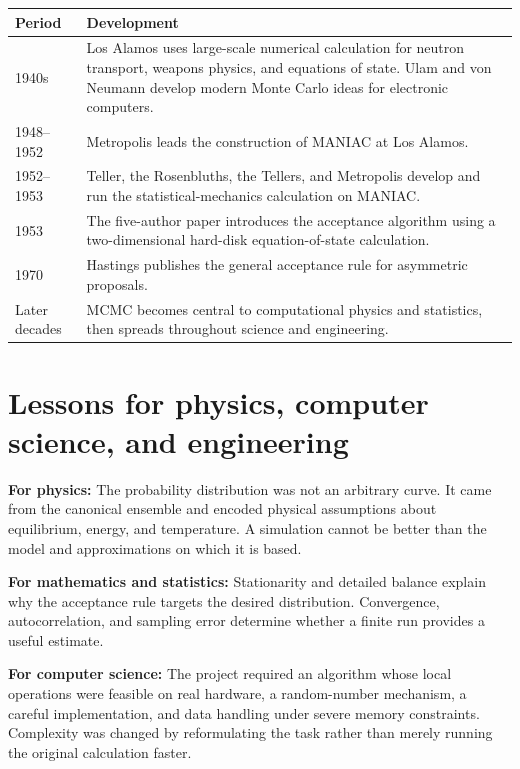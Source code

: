 \documentclass[11pt]{article}
\begin{document}
\begin{center}
\begin{tabular}{@{}p{}p{}@{}}
\toprule
\textbf{Period} & \textbf{Development} \\
\midrule
1940s & Los Alamos uses large-scale numerical calculation for neutron transport,
        weapons physics, and equations of state. Ulam and von Neumann develop
        modern Monte Carlo ideas for electronic computers. \\
1948--1952 & Metropolis leads the construction of MANIAC at Los Alamos. \\
1952--1953 & Teller, the Rosenbluths, the Tellers, and Metropolis develop and run
             the statistical-mechanics calculation on MANIAC. \\
1953 & The five-author paper introduces the acceptance algorithm using a
       two-dimensional hard-disk equation-of-state calculation. \\
1970 & Hastings publishes the general acceptance rule for asymmetric proposals. \\
Later decades & MCMC becomes central to computational physics and statistics,
                then spreads throughout science and engineering. \\
\bottomrule
\end{tabular}
\end{center}

\section{Lessons for physics, computer science, and engineering}

\textbf{For physics:} The probability distribution was not an arbitrary curve.
It came from the canonical ensemble and encoded physical assumptions about
equilibrium, energy, and temperature. A simulation cannot be better than the
model and approximations on which it is based.

\textbf{For mathematics and statistics:} Stationarity and detailed balance
explain why the acceptance rule targets the desired distribution. Convergence,
autocorrelation, and sampling error determine whether a finite run provides a
useful estimate.

\textbf{For computer science:} The project required an algorithm whose local
operations were feasible on real hardware, a random-number mechanism, a careful
implementation, and data handling under severe memory constraints. Complexity
was changed by reformulating the task rather than merely running the original
calculation faster.
\end{document}
